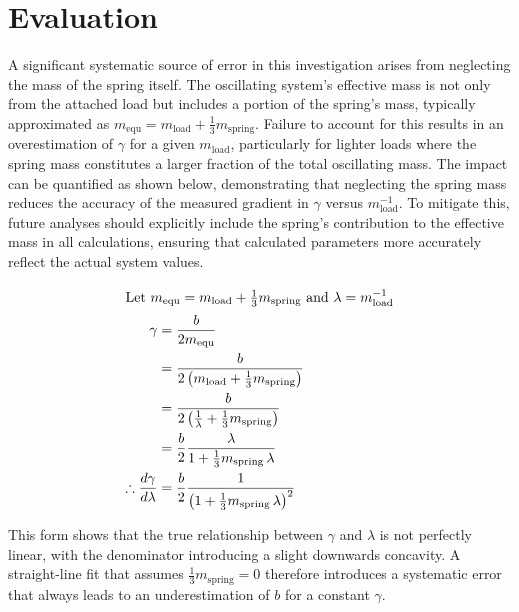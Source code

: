 \section{Evaluation}
\setlength{\parindent}{15pt}

A significant systematic source of error in this investigation arises from neglecting the mass of the spring itself. The oscillating system’s effective mass is not only from the attached load but includes a portion of the spring’s mass, typically approximated as $m_{\mathrm{equ}} = m_{\mathrm{load}} + \tfrac{1}{3} m_{\mathrm{spring}}$. Failure to account for this results in an overestimation of $\gamma$ for a given $m_{\mathrm{load}}$, particularly for lighter loads where the spring mass constitutes a larger fraction of the total oscillating mass. The impact can be quantified as shown below, demonstrating that neglecting the spring mass reduces the accuracy of the measured gradient in $\gamma$ versus $m_{\mathrm{load}}^{-1}$. To mitigate this, future analyses should explicitly include the spring’s contribution to the effective mass in all calculations, ensuring that calculated parameters more accurately reflect the actual system values.

\vspace{-1em}

\begin{align*}
\intertext{Let $m_{\mathrm{equ}} = m_{\mathrm{load}} + \tfrac{1}{3} m_{\mathrm{spring}}$ and $\lambda = m_{\mathrm{load}}^{-1}$}
\gamma &= \frac{b}{2 m_{\mathrm{equ}}} \\
       &= \frac{b}{2 \left(m_{\mathrm{load}} + \tfrac{1}{3} m_{\mathrm{spring}}\right)} \\
       &= \frac{b}{2 \left(\tfrac{1}{\lambda} + \tfrac{1}{3} m_{\mathrm{spring}}\right)} \\
       &= \frac{b}{2} \frac{\lambda}{1 + \tfrac{1}{3} m_{\mathrm{spring}} \, \lambda} \\
\therefore \frac{d \gamma}{d \lambda} &= \frac{b}{2} \frac{1}{\left(1 + \tfrac{1}{3} m_{\mathrm{spring}} \, \lambda\right)^2}
\end{align*}

\vspace{0.5em}

\noindent This form shows that the true relationship between $\gamma$ and $\lambda$ is not perfectly linear, with the denominator introducing a slight downwards concavity.
A straight-line fit that assumes $\tfrac{1}{3} m_{\mathrm{spring}} = 0$ therefore introduces a systematic error that always leads to an underestimation of $b$ for a constant $\gamma$.

